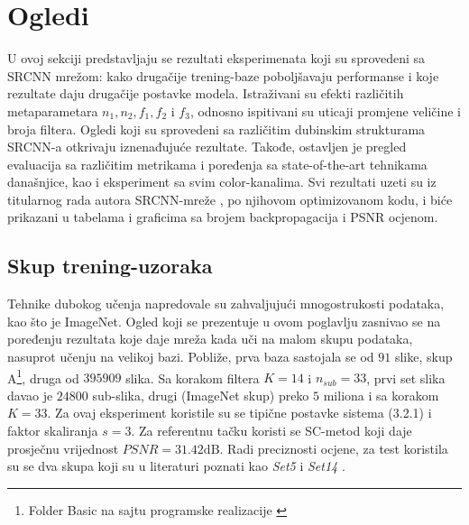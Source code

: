 \documentclass[12pt]{report}
\numberwithin{equation}{section}
\begin{document}

\chapter{Ogledi}\label{ch2}

  U ovoj sekciji predstavljaju se rezultati eksperimenata koji su sprovedeni sa SRCNN mrežom: kako drugačije trening-baze poboljšavaju performanse i koje rezultate daju drugačije postavke modela. Istraživani su efekti različitih metaparametara  $n_1, n_2, f_1, f_2$ i $f_3$, odnosno ispitivani su uticaji promjene veličine i broja filtera. Ogledi koji su sprovedeni sa različitim dubinskim strukturama SRCNN-a otkrivaju iznenađujuće rezultate. Takođe, ostavljen je pregled evaluacija sa različitim metrikama i poređenja sa state-of-the-art tehnikama današnjice, kao i eksperiment sa svim color-kanalima. Svi rezultati uzeti su iz titularnog rada autora SRCNN-mreže \cite{main}, po njihovom optimizovanom kodu, i biće prikazani u tabelama i  graficima sa brojem backpropagacija i PSNR ocjenom. 
  
  \section{Skup trening-uzoraka}


  
  Tehnike dubokog učenja napredovale su zahvaljujući mnogostrukosti podataka, kao što je ImageNet. Ogled koji se prezentuje u ovom poglavlju zasnivao se na poređenju rezultata koje daje mreža kada uči na malom skupu podataka, nasuprot učenju na velikoj bazi. Pobliže, prva baza sastojala se od $91$ slike, skup A\footnote{Folder Basic na sajtu programske realizacije \cite{samples}}, druga od $395 909$ slika. Sa korakom filtera $K=14$ i $n_{sub}=33$, prvi set slika davao je $24 800$ sub-slika, drugi (ImageNet skup) preko $5$ miliona i sa korakom $K=33$. Za ovaj eksperiment koristile su se tipične postavke sistema (3.2.1) i faktor skaliranja $s = 3$. Za referentnu tačku koristi se SC-metod \cite{sparse1} koji daje prosječnu vrijednost $PSNR = 31.42\text{dB}$.  Radi preciznosti ocjene, za test koristila su se dva skupa koji su u literaturi poznati kao \textit{Set5} i \textit{Set14} \cite{samples}.
\end{document}
